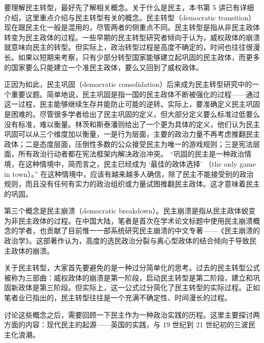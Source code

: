 
要理解民主转型，最好先了解相关概念。关于什么是民主，本书第 5 讲已有详细介绍，这里重点介绍与民主转型有关的概念。民主转型（democratic transition）现在跟民主化一般是混用的，尽管两者的侧重点不同。民主转型是指从非民主政体转变为民主政体的过程。一些早期的民主转型研究者倾向于认为，威权政体的崩溃就意味向民主的转型。但实际上，政治转型过程是高度不确定的，时间也往往很漫长。如果以短期来考察，只有少部分转型国家能够建立起巩固的民主政体，而更多的国家要么只能建立一个准民主政体，要么又回到了威权政体。

正因为如此，民主巩固（democratic consolidation）后来成为民主转型研究中的一个重要议题。简单地说，民主巩固是指一国的民主政体不断被强化的过程——通过这一过程，民主能够继续生存并能防止可能的逆转。实际上，要准确定义民主巩固是困难的。尽管很多学者给出了民主巩固的定义，但大部分定义要么标准过低要么没有标准，难以衡量。林茨和斯泰潘则给出了一个更为具体的定义，他们认为民主巩固可以从三个维度加以衡量，一是行为层面，主要的政治力量不再考虑推翻民主政体；二是态度层面，压倒性多数的公众接受民主为唯一的游戏规则；三是宪法层面，所有政治行动者都在宪法框架内解决政治冲突。 “巩固的民主是一种政治情境，在这种情境中，简而言之，民主已经成为 ‘最佳的政体选择’ （the only game in town）。” 在这种情境中，应该有越来越多人确信，除了民主不能接受别的政治规则，而且没有任何有实力的政治组织或力量试图推翻民主政体。这才意味着民主的巩固。

第三个概念是民主崩溃（democratic breakdown）。民主崩溃是指从民主政体蜕变为非民主政体的过程。在中国大陆，笔者是首次在学术论文标题中使用民主崩溃概念的学者，也贡献了目前惟一一部系统研究民主崩溃的中文专著——《民主崩溃的政治学》。这部著作认为，高度的选民政治分裂与离心型政体的结合倾向于导致民主政体的崩溃。

关于民主转型，大家首先要避免的是一种过分简单化的思考。过去的民主转型公式被称为三部曲：威权政体的崩溃是第一阶段，启动民主转型是第二阶段，建立和巩固新政体是第三阶段。但实际上，这一公式过分简化了民主转型的实际过程。正如笔者业已指出的，民主转型往往是一个充满不确定性、时间漫长的过程。


讨论这些概念之后，需要回顾一下民主作为一种政治实践的历程。这里主要探讨两方面的内容：现代民主的起源——英国的实践，与 19 世纪到 21 世纪初的三波民主化浪潮。

